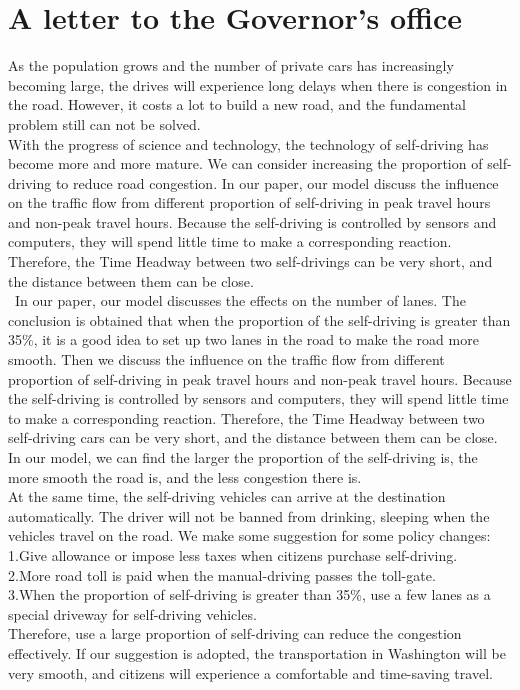 \documentclass{mcmthesis}
\begin{document}
\section{A letter to the Governor's office}
As the population grows and the number of private cars has increasingly becoming large, the drives will experience long delays when there is congestion in the road. However, it costs a lot to build a new road, and the fundamental problem still can not be solved.\\
\indent With the progress of science and technology, the technology of self-driving has become more and more mature. We can consider increasing the proportion of self-driving to reduce road congestion.
In our paper, our model discuss the influence on the traffic flow from different proportion of self-driving in peak travel hours and non-peak travel hours. Because the self-driving is controlled by sensors and computers, they will spend little time to make a corresponding reaction. Therefore, the Time Headway between two self-drivings can be very short, and the distance between them can be close.\\ \
\indent In our paper, our model discusses the effects on the number of lanes. The conclusion is obtained that when the proportion of the self-driving is greater than 35\%, it is a good idea to set up two lanes in the road to make the road more smooth. Then we discuss the influence on the traffic flow from different proportion of self-driving in peak travel hours and non-peak travel hours. Because the self-driving is controlled by sensors and computers, they will spend little time to make a corresponding reaction. Therefore, the Time Headway between two self-driving cars can be very short, and the distance between them can be close. In our model, we can find the larger the proportion of the self-driving is, the more smooth the road is, and the less congestion there is. \\
\indent At the same time, the self-driving vehicles can arrive at the destination automatically. The driver will not be banned from drinking, sleeping when the vehicles travel on the road.
We make some suggestion for some policy changes:\\
\indent 1.Give allowance or impose less taxes when citizens purchase self-driving.\\
\indent 2.More road toll is paid when the manual-driving passes the toll-gate.\\
\indent 3.When the proportion of self-driving is greater than 35\%, use a few lanes as a special driveway for self-driving vehicles.\\
\indent Therefore, use a large proportion of self-driving can reduce the congestion effectively. If our suggestion is adopted, the transportation in Washington will be very smooth, and citizens will experience a comfortable and time-saving travel. 
\end{document}
